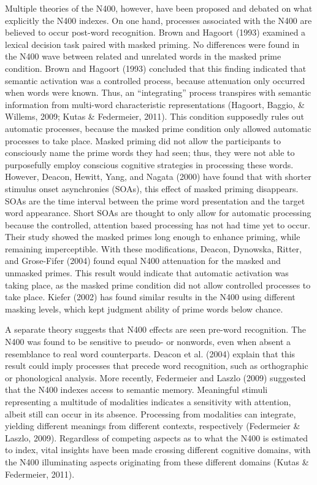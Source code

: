 \documentclass[english,man]{apa6}
\theoremstyle{definition}
\theoremstyle{definition}
\theoremstyle{definition}
\theoremstyle{remark}
\begin{document}
Multiple theories of the N400, however, have been proposed and debated
on what explicitly the N400 indexes. On one hand, processes associated
with the N400 are believed to occur post-word recognition. Brown and
Hagoort (1993) examined a lexical decision task paired with masked
priming. No differences were found in the N400 wave between related and
unrelated words in the masked prime condition. Brown and Hagoort (1993)
concluded that this finding indicated that semantic activation was a
controlled process, because attenuation only occurred when words were
known. Thus, an \enquote{integrating} process transpires with semantic
information from multi-word characteristic representations (Hagoort,
Baggio, \& Willems, 2009; Kutas \& Federmeier, 2011). This condition
supposedly rules out automatic processes, because the masked prime
condition only allowed automatic processes to take place. Masked priming
did not allow the participants to consciously name the prime words they
had seen; thus, they were not able to purposefully employ conscious
cognitive strategies in processing these words. However, Deacon, Hewitt,
Yang, and Nagata (2000) have found that with shorter stimulus onset
asynchronies (SOAs), this effect of masked priming disappears. SOAs are
the time interval between the prime word presentation and the target
word appearance. Short SOAs are thought to only allow for automatic
processing because the controlled, attention based processing has not
had time yet to occur. Their study showed the masked primes long enough
to enhance priming, while remaining imperceptible. With these
modifications, Deacon, Dynowska, Ritter, and Grose-Fifer (2004) found
equal N400 attenuation for the masked and unmasked primes. This result
would indicate that automatic activation was taking place, as the masked
prime condition did not allow controlled processes to take place. Kiefer
(2002) has found similar results in the N400 using different masking
levels, which kept judgment ability of prime words below chance.

A separate theory suggests that N400 effects are seen pre-word
recognition. The N400 was found to be sensitive to pseudo- or nonwords,
even when absent a resemblance to real word counterparts. Deacon et al.
(2004) explain that this result could imply processes that precede word
recognition, such as orthographic or phonological analysis. More
recently, Federmeier and Laszlo (2009) suggested that the N400 indexes
access to semantic memory. Meaningful stimuli representing a multitude
of modalities indicates a sensitivity with attention, albeit still can
occur in its absence. Processing from modalities can integrate, yielding
different meanings from different contexts, respectively (Federmeier \&
Laszlo, 2009). Regardless of competing aspects as to what the N400 is
estimated to index, vital insights have been made crossing different
cognitive domains, with the N400 illuminating aspects originating from
these different domains (Kutas \& Federmeier, 2011).
\end{document}
